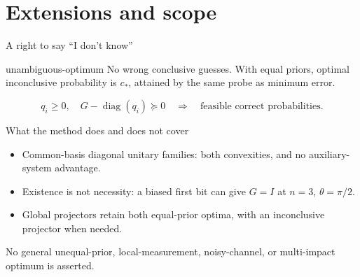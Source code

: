 \documentclass{beamer}
\begin{document}
\section{Extensions and scope}
\begin{frame}{A right to say ``I don't know''}
  \begin{bookresult}{unambiguous-optimum}
    No wrong conclusive guesses. With equal priors, optimal inconclusive probability is $c_*$, attained by the same probe as minimum error.
  \end{bookresult}
  \[
    q_i\geq0,\quad G-\operatorname{diag}(q_i)\succeq0
    \quad\Longrightarrow\quad\text{feasible correct probabilities}.
  \]
\end{frame}

\begin{frame}{What the method does and does not cover}
  \begin{itemize}
   \item Common-basis diagonal unitary families: both convexities, and no auxiliary-system advantage.
   \item Existence is not necessity: a biased first bit can give $G=I$ at $n=3$, $\theta=\pi/2$.
   \item Global projectors retain both equal-prior optima, with an inconclusive projector when needed.
  \end{itemize}
  No general unequal-prior, local-measurement, noisy-channel, or multi-impact optimum is asserted.
\end{frame}
\end{document}
